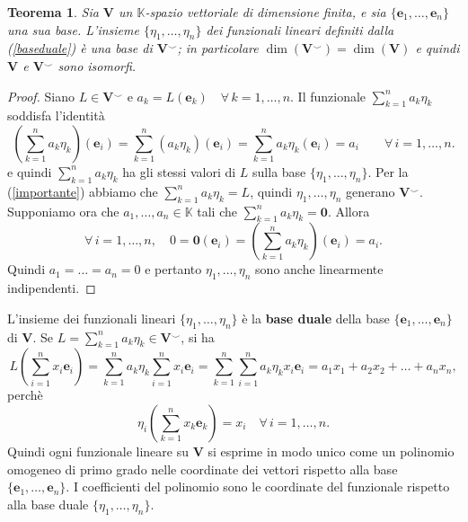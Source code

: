 \documentclass{article}
\theoremstyle{plain}
\newtheorem{thm}{Teorema}[section]
\theoremstyle{definition}
\theoremstyle{remark}
\begin{document}
\vspace{10pt}

\begin{bxthm}
    \begin{thm}
        Sia $\mathbf{V}$ un $\mathbb{K}$-spazio vettoriale di dimensione finita, e sia $\{\mathbf{e}_1,\ldots,\mathbf{e}_n\}$ una sua base.
        L'insieme $\{\eta_1,\ldots,\eta_n\}$ dei funzionali lineari definiti dalla (\ref{baseduale}) è una base di $\mathbf{V}^\smallsmile$; 
        in particolare $\dim(\mathbf{V}^\smallsmile)=\dim(\mathbf{V})$ e quindi $\mathbf{V}$ e $\mathbf{V}^\smallsmile$ sono isomorfi.
    \end{thm}
\end{bxthm}
\begin{proof}
    Siano $L\in\mathbf{V}^\smallsmile$ e $a_k=L(\mathbf{e}_k)\quad \forall\,k=1,\ldots,n$.
    Il funzionale $\sum\limits_{k=1}^{n}a_k\eta_k$ soddisfa l'identità 
    \[\left(\sum_{k=1}^{n}a_k\eta_k\right)(\mathbf{e}_i)=\sum_{k=1}^{n}(a_k\eta_k)(\mathbf{e}_i)=\sum_{k=1}^{n}a_k\eta_k(\mathbf{e}_i)=a_i\quad\quad\forall\,i=1,\ldots,n.\]
    e quindi $\sum\limits_{k=1}^{n}a_k\eta_k$ ha gli stessi valori di $L$ sulla base $\{\eta_1,\ldots,\eta_n\}$. 
    Per la (\ref{importante}) abbiamo che $\sum\limits_{k=1}^{n}a_k\eta_k=L$, quindi $\eta_1,\ldots,\eta_n$ generano $\mathbf{V}^\smallsmile$.
    Supponiamo ora che $a_1,\ldots,a_n\in\mathbb{K}$ tali che $\sum\limits_{k=1}^{n}a_k\eta_k=\mathbf{0}$.
    Allora 
    \[\forall\,i=1,\ldots,n,\quad 0=\mathbf{0}(\mathbf{e}_i)=\left(\sum\limits_{k=1}^{n}a_k\eta_k\right)(\mathbf{e}_i)=a_i.\]
    Quindi $a_1=\ldots=a_n=0$ e pertanto $\eta_1,\ldots,\eta_n$ sono anche linearmente indipendenti.
\end{proof}

\vspace{10pt}

L'insieme dei funzionali lineari $\{\eta_1,\ldots,\eta_n\}$ è la \textbf{base duale} della base $\{\mathbf{e}_1,\ldots,\mathbf{e}_n\}$ di $\mathbf{V}$.
Se $L=\sum\limits_{k=1}^{n}a_k\eta_k\in\mathbf{V}^\smallsmile$, si ha 
\[L\left(\sum_{i=1}^{n}x_i\mathbf{e}_i\right)=\sum\limits_{k=1}^{n}a_k\eta_k\sum_{i=1}^{n}x_i\mathbf{e}_i=\sum\limits_{k=1}^{n}\sum_{i=1}^{n}a_k\eta_kx_i\mathbf{e}_i=a_1x_1+a_2x_2+\ldots+a_nx_n,\]
perchè \[\eta_i\left(\sum_{k=1}^{n}x_k\mathbf{e}_k\right)=x_i\quad\forall\,i=1,\ldots,n.\]
Quindi ogni funzionale lineare su $\mathbf{V}$ si esprime in modo unico come un polinomio omogeneo di primo grado nelle coordinate dei vettori rispetto alla base $\{\mathbf{e}_1,\ldots,\mathbf{e}_n\}$.
I coefficienti del polinomio sono le coordinate del funzionale rispetto alla base duale $\{\eta_1,\ldots,\eta_n\}$.
\end{document}
